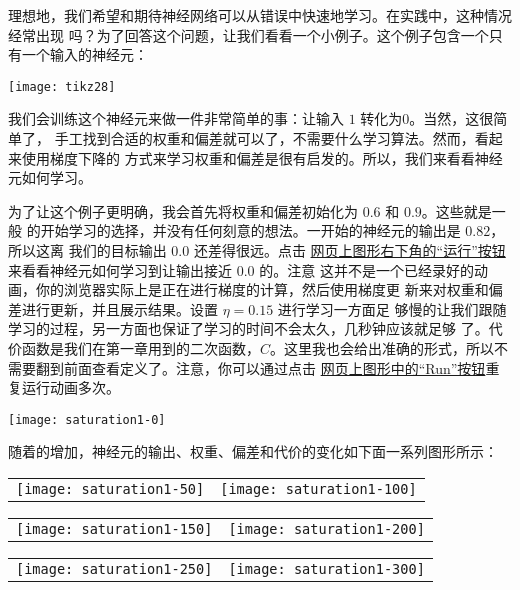 理想地，我们希望和期待神经网络可以从错误中快速地学习。在实践中，这种情况经常出现
吗？为了回答这个问题，让我们看看一个小例子。这个例子包含一个只有一个输入的神经元：

\begin{center}
  \texttt{[image: tikz28]}
\end{center}

我们会训练这个神经元来做一件非常简单的事：让输入 $1$ 转化为$0$。当然，这很简单了，
手工找到合适的权重和偏差就可以了，不需要什么学习算法。然而，看起来使用梯度下降的
方式来学习权重和偏差是很有启发的。所以，我们来看看神经元如何学习。

为了让这个例子更明确，我会首先将权重和偏差初始化为 $0.6$ 和 $0.9$。这些就是一般
的开始学习的选择，并没有任何刻意的想法。一开始的神经元的输出是 $0.82$，所以这离
我们的目标输出 $0.0$ 还差得很远。点击%
\href{http://neuralnetworksanddeeplearning.com/chap3.html#the_cross-entropy_cost_function}{
  网页上图形右下角的``运行''按钮}来看看神经元如何学习到让输出接近 $0.0$ 的。注意
这并不是一个已经录好的动画，你的浏览器实际上是正在进行梯度的计算，然后使用梯度更
新来对权重和偏差进行更新，并且展示结果。设置\learningrate{} $\eta=0.15$ 进行学习一方面足
够慢的让我们跟随学习的过程，另一方面也保证了学习的时间不会太久，几秒钟应该就足够
了。代价函数是我们在第一章用到的二次函数，$C$。这里我也会给出准确的形式，所以不
需要翻到前面查看定义了。注意，你可以通过点击%
\href{http://neuralnetworksanddeeplearning.com/chap3.html#the_cross-entropy_cost_function}{
  网页上图形中的``Run''按钮}重复运行动画多次。
\begin{center}
  \texttt{[image: saturation1-0]}
\end{center}
随着\epochs{}的增加，神经元的输出、权重、偏差和代价的变化如下面一系列图形所示：
\begin{center}
  \begin{tabular}{ll}
    \texttt{[image: saturation1-50]} & \texttt{[image: saturation1-100]}\\
  \end{tabular}
  \begin{tabular}{ll}
    \texttt{[image: saturation1-150]} & \texttt{[image: saturation1-200]}\\
  \end{tabular}
  \begin{tabular}{ll}
    \texttt{[image: saturation1-250]} & \texttt{[image: saturation1-300]}
  \end{tabular}
\end{center}

